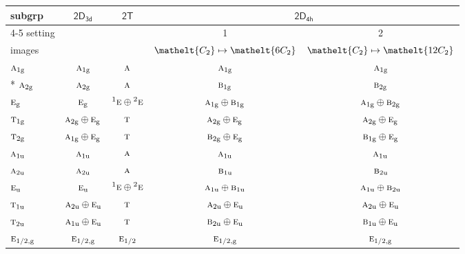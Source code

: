 \documentclass[10pt,a4paper]{article}
\numberwithin{equation}{section}
\newcommand{\eltfont}[1]{{\let\sigma\eltsigma\mathelt{#1}}}
\newcommand{\grp}[1]{\mathsf{#1}}
\newcommand{\irr}[1]{\text{\normalfont\scshape #1}}
\newcommand{\conjpair}[1]{{}^{#1}}
\newcommand{\cls}[1]{\eltfont{#1}}
\newcommand{\ptag}[1]{\mathrm{#1}}
\begin{document}
{\small\begin{longtable}{@{}lcccc@{}}\toprule
subgrp & \href{2D3d.pdf}{$\grp{2D_{3d}}$} & \href{2T.pdf}{$\grp{2T}$} & \multicolumn{2}{c}{\href{2D4h.pdf}{$\grp{2D_{4h}}$}}\\\cmidrule(lr){4-5}
setting &  &  & 1 & 2\\
images &  &  & {\scriptsize $\cls{C_{2}} \mapsto \cls{6C_{2}}$} & {\scriptsize $\cls{C_{2}} \mapsto \cls{12C_{2}}$}\\\midrule\endhead
\bottomrule\endfoot\endlastfoot
$\irr{a}_{1\ptag{g}}$ & $\irr{a}_{1\ptag{g}}$ & $\irr{a}$ & $\irr{a}_{1\ptag{g}}$ & $\irr{a}_{1\ptag{g}}$\\*
$\irr{a}_{2\ptag{g}}$ & $\irr{a}_{2\ptag{g}}$ & $\irr{a}$ & $\irr{b}_{1\ptag{g}}$ & $\irr{b}_{2\ptag{g}}$\\
$\irr{e}_{\ptag{g}}$ & $\irr{e}_{\ptag{g}}$ & $\conjpair{1}\irr{e}\oplus \conjpair{2}\irr{e}$ & $\irr{a}_{1\ptag{g}}\oplus \irr{b}_{1\ptag{g}}$ & $\irr{a}_{1\ptag{g}}\oplus \irr{b}_{2\ptag{g}}$\\
$\irr{t}_{1\ptag{g}}$ & $\irr{a}_{2\ptag{g}}\oplus \irr{e}_{\ptag{g}}$ & $\irr{t}$ & $\irr{a}_{2\ptag{g}}\oplus \irr{e}_{\ptag{g}}$ & $\irr{a}_{2\ptag{g}}\oplus \irr{e}_{\ptag{g}}$\\
$\irr{t}_{2\ptag{g}}$ & $\irr{a}_{1\ptag{g}}\oplus \irr{e}_{\ptag{g}}$ & $\irr{t}$ & $\irr{b}_{2\ptag{g}}\oplus \irr{e}_{\ptag{g}}$ & $\irr{b}_{1\ptag{g}}\oplus \irr{e}_{\ptag{g}}$\\
$\irr{a}_{1\ptag{u}}$ & $\irr{a}_{1\ptag{u}}$ & $\irr{a}$ & $\irr{a}_{1\ptag{u}}$ & $\irr{a}_{1\ptag{u}}$\\
$\irr{a}_{2\ptag{u}}$ & $\irr{a}_{2\ptag{u}}$ & $\irr{a}$ & $\irr{b}_{1\ptag{u}}$ & $\irr{b}_{2\ptag{u}}$\\
$\irr{e}_{\ptag{u}}$ & $\irr{e}_{\ptag{u}}$ & $\conjpair{1}\irr{e}\oplus \conjpair{2}\irr{e}$ & $\irr{a}_{1\ptag{u}}\oplus \irr{b}_{1\ptag{u}}$ & $\irr{a}_{1\ptag{u}}\oplus \irr{b}_{2\ptag{u}}$\\
$\irr{t}_{1\ptag{u}}$ & $\irr{a}_{2\ptag{u}}\oplus \irr{e}_{\ptag{u}}$ & $\irr{t}$ & $\irr{a}_{2\ptag{u}}\oplus \irr{e}_{\ptag{u}}$ & $\irr{a}_{2\ptag{u}}\oplus \irr{e}_{\ptag{u}}$\\
$\irr{t}_{2\ptag{u}}$ & $\irr{a}_{1\ptag{u}}\oplus \irr{e}_{\ptag{u}}$ & $\irr{t}$ & $\irr{b}_{2\ptag{u}}\oplus \irr{e}_{\ptag{u}}$ & $\irr{b}_{1\ptag{u}}\oplus \irr{e}_{\ptag{u}}$\\
$\irr{e}_{1/2,\ptag{g}}$ & $\irr{e}_{1/2,\ptag{g}}$ & $\irr{e}_{1/2}$ & $\irr{e}_{1/2,\ptag{g}}$ & $\irr{e}_{1/2,\ptag{g}}$\\

\end{longtable}}
\end{document}
